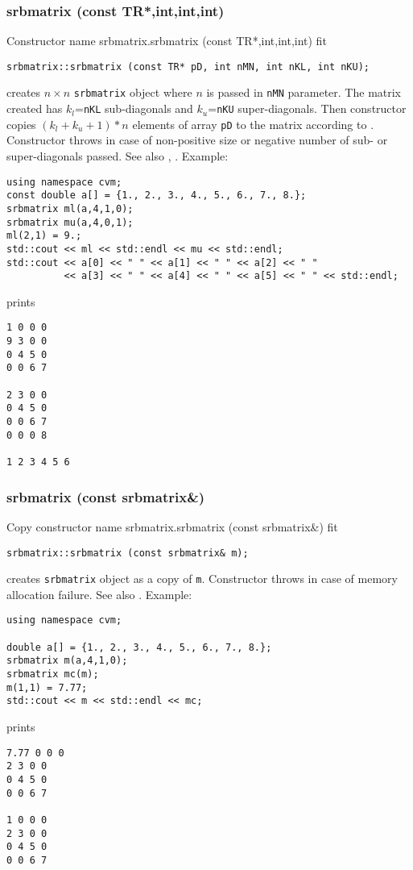 \subsubsection{srbmatrix (const TR*,int,int,int)}
Constructor%
\pdfdest name {srbmatrix.srbmatrix (const TR*,int,int,int)} fit
\begin{verbatim}
srbmatrix::srbmatrix (const TR* pD, int nMN, int nKL, int nKU);
\end{verbatim}
creates  $n\times n$ \verb"srbmatrix" object where $n$ is passed in
\verb"nMN" parameter. The matrix created has $k_l$=\verb"nKL"
sub-diagonals and $k_u$=\verb"nKU" super-diagonals.
Then constructor copies $(k_l + k_u + 1)*n$ elements of  array \verb"pD" to the 
matrix according to .
Constructor throws  
in case of non-positive size or negative number of sub- or super-diagonals 
passed.
See also ,
.
Example:
\begin{Verbatim}
using namespace cvm;
const double a[] = {1., 2., 3., 4., 5., 6., 7., 8.};
srbmatrix ml(a,4,1,0);
srbmatrix mu(a,4,0,1);
ml(2,1) = 9.;
std::cout << ml << std::endl << mu << std::endl;
std::cout << a[0] << " " << a[1] << " " << a[2] << " "
          << a[3] << " " << a[4] << " " << a[5] << " " << std::endl;
\end{Verbatim}
prints
\begin{Verbatim}
1 0 0 0
9 3 0 0
0 4 5 0
0 0 6 7

2 3 0 0
0 4 5 0
0 0 6 7
0 0 0 8

1 2 3 4 5 6
\end{Verbatim}
\newpage


\subsubsection{srbmatrix (const srbmatrix\&)}
Copy constructor%
\pdfdest name {srbmatrix.srbmatrix (const srbmatrix&)} fit
\begin{verbatim}
srbmatrix::srbmatrix (const srbmatrix& m);
\end{verbatim}
creates  \verb"srbmatrix" object as a copy of \verb"m".
Constructor throws  
in case of memory allocation failure.
See also .
Example:
\begin{Verbatim}
using namespace cvm;

double a[] = {1., 2., 3., 4., 5., 6., 7., 8.};
srbmatrix m(a,4,1,0);
srbmatrix mc(m);
m(1,1) = 7.77;
std::cout << m << std::endl << mc;
\end{Verbatim}
prints
\begin{Verbatim}
7.77 0 0 0
2 3 0 0
0 4 5 0
0 0 6 7

1 0 0 0
2 3 0 0
0 4 5 0
0 0 6 7
\end{Verbatim}
\newpage



